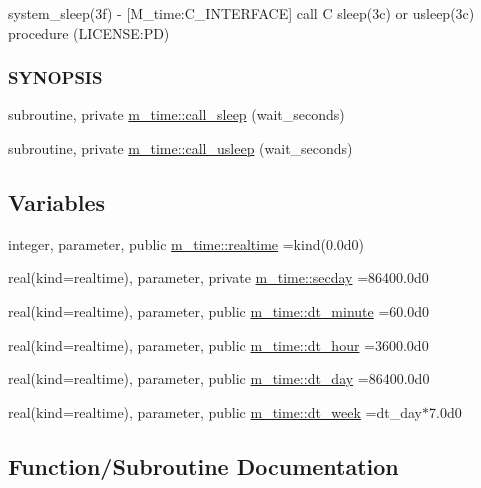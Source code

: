 \begin{DoxyCompactItemize}
\begin{DoxyCompactList}
system\+\_\+sleep(3f) -\/ \mbox{[}M\+\_\+time\+:C\+\_\+\+I\+N\+T\+E\+R\+F\+A\+CE\mbox{]} call C sleep(3c) or usleep(3c) procedure (L\+I\+C\+E\+N\+SE\+:PD) \subsubsection*{S\+Y\+N\+O\+P\+S\+IS}\end{DoxyCompactList}\item 
subroutine, private \mbox{\hyperlink{namespacem__time_af558bfc1fd5b13a6b879b3969866956f}{m\+\_\+time\+::call\+\_\+sleep}} (wait\+\_\+seconds)
\item 
subroutine, private \mbox{\hyperlink{namespacem__time_ae63783f7479d2f5093c8031d38ce4304}{m\+\_\+time\+::call\+\_\+usleep}} (wait\+\_\+seconds)
\end{DoxyCompactItemize}
\subsection*{Variables}
\begin{DoxyCompactItemize}
\item 
integer, parameter, public \mbox{\hyperlink{namespacem__time_ac10ea9e8d59ec74eaa7d89f2517d7422}{m\+\_\+time\+::realtime}} =kind(0.\+0d0)
\item 
real(kind=realtime), parameter, private \mbox{\hyperlink{namespacem__time_a48130b5a95a3f2e776269dcee1426797}{m\+\_\+time\+::secday}} =86400.\+0d0
\item 
real(kind=realtime), parameter, public \mbox{\hyperlink{namespacem__time_a9fe6fbb44e2779a2fcf96fba36c08918}{m\+\_\+time\+::dt\+\_\+minute}} =60.\+0d0
\item 
real(kind=realtime), parameter, public \mbox{\hyperlink{namespacem__time_aa0ca2172092f5e7dcc9b8524e6516fd8}{m\+\_\+time\+::dt\+\_\+hour}} =3600.\+0d0
\item 
real(kind=realtime), parameter, public \mbox{\hyperlink{namespacem__time_a97725f8d657c24badff19a794f323a6b}{m\+\_\+time\+::dt\+\_\+day}} =86400.\+0d0
\item 
real(kind=realtime), parameter, public \mbox{\hyperlink{namespacem__time_a3d53519e90264faccdae67e389ffc003}{m\+\_\+time\+::dt\+\_\+week}} =dt\+\_\+day$\ast$7.\+0d0
\end{DoxyCompactItemize}


\subsection{Function/\+Subroutine Documentation}
\mbox{\label{M__time_8f90_a4a68c5e906616f64da0c3d165fc41479}} 
